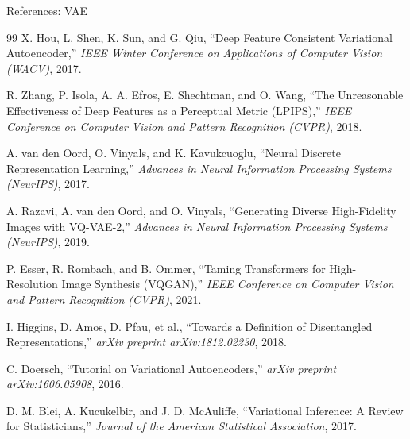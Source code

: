 \begin{frame}[allowframebreaks]{References: VAE}
\begin{thebibliography}{99}
        X. Hou, L. Shen, K. Sun, and G. Qiu,
        \newblock ``Deep Feature Consistent Variational Autoencoder,''
        \newblock \emph{IEEE Winter Conference on Applications of Computer Vision (WACV)}, 2017.

        R. Zhang, P. Isola, A. A. Efros, E. Shechtman, and O. Wang,
        \newblock ``The Unreasonable Effectiveness of Deep Features as a Perceptual Metric (LPIPS),''
        \newblock \emph{IEEE Conference on Computer Vision and Pattern Recognition (CVPR)}, 2018.

        A. van den Oord, O. Vinyals, and K. Kavukcuoglu,
        \newblock ``Neural Discrete Representation Learning,''
        \newblock \emph{Advances in Neural Information Processing Systems (NeurIPS)}, 2017.

        A. Razavi, A. van den Oord, and O. Vinyals,
        \newblock ``Generating Diverse High-Fidelity Images with VQ-VAE-2,''
        \newblock \emph{Advances in Neural Information Processing Systems (NeurIPS)}, 2019.

        P. Esser, R. Rombach, and B. Ommer,
        \newblock ``Taming Transformers for High-Resolution Image Synthesis (VQGAN),''
        \newblock \emph{IEEE Conference on Computer Vision and Pattern Recognition (CVPR)}, 2021.

        I. Higgins, D. Amos, D. Pfau, et al.,
        \newblock ``Towards a Definition of Disentangled Representations,''
        \newblock \emph{arXiv preprint arXiv:1812.02230}, 2018.

        C. Doersch,
        \newblock ``Tutorial on Variational Autoencoders,''
        \newblock \emph{arXiv preprint arXiv:1606.05908}, 2016.

        D. M. Blei, A. Kucukelbir, and J. D. McAuliffe,
        \newblock ``Variational Inference: A Review for Statisticians,''
        \newblock \emph{Journal of the American Statistical Association}, 2017.
    \end{thebibliography}
\end{frame}
